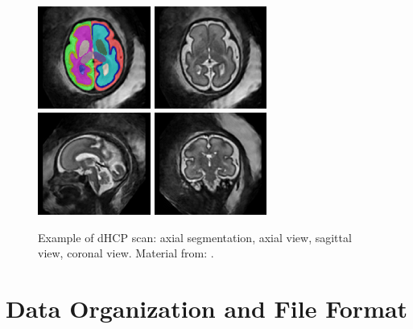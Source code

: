 \begin{figure}[p]
    \centering
    \includegraphics[width=0.33\textwidth]{figures/dhcp_ax_dseg.png}
    \hspace{5pt}
    \includegraphics[width=0.33\textwidth]{figures/dhcp_ax.png} \\
    \vspace{10pt}
    \includegraphics[width=0.33\textwidth]{figures/dhcp_sag.png}
    \hspace{5pt}
    \includegraphics[width=0.33\textwidth]{figures/dhcp_cor.png}
    \caption{Example of dHCP scan: axial segmentation, axial view, sagittal view, coronal view. Material from: \cite{dHCP}.}
    \label{fig:dhcp_images}
\end{figure}

\section{Data Organization and File Format}

